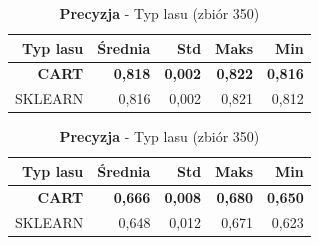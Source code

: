 \documentclass[a4paper]{article}
\begin{document}
    \begin{table}[htbp]
        \centering
        \small
        \setlength{\tabcolsep}{4pt}
        \renewcommand{\arraystretch}{1.2}

        \begin{minipage}[t]{0.48\textwidth}
            \centering
            \caption{\textbf{Dokładność} - Typ lasu (zbiór 350)}
            \label{tab:Compare_on_350_acc}
            \begin{tabular}{r|r|r|r|r}
                \toprule
                Typ lasu & Średnia & Std & Maks & Min \\
                \hline
                \textbf{CART} & \textbf{0,818} & \textbf{0,002} & \textbf{0,822} & \textbf{0,816} \\
                SKLEARN & 0,816 & 0,002 & 0,821 & 0,812 \\
                \bottomrule
            \end{tabular}
        \end{minipage}
        \hfill
        \begin{minipage}[t]{0.48\textwidth}
            \centering
            \caption{\textbf{Precyzja} - Typ lasu (zbiór 350)}
            \label{tab:Compare_on_350_prec}
            \begin{tabular}{r|r|r|r|r}
                \toprule
                Typ lasu & Średnia & Std & Maks & Min \\
                \hline
                \textbf{CART} & \textbf{0,666} & \textbf{0,008} & \textbf{0,680} & \textbf{0,650} \\
                SKLEARN & 0,648 & 0,012 & 0,671 & 0,623 \\
                \bottomrule
            \end{tabular}
        \end{minipage}

        \vspace{0.5cm}


\end{table}
\end{document}
